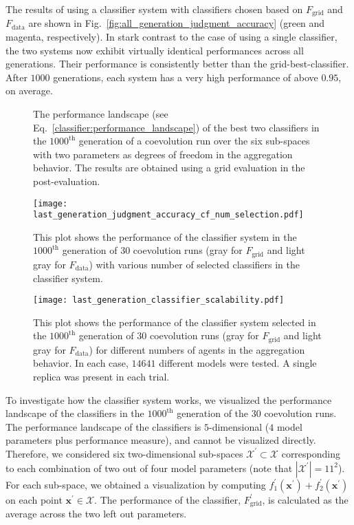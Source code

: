 The results of using a classifier system with classifiers chosen based on $F_\textrm{grid}$ and $F_\textrm{data}$ are shown in Fig.~\ref{fig:all_generation_judgment_accuracy} (green and magenta, respectively). In stark contrast to the case of using a single classifier, the two systems now exhibit virtually identical performances across all generations. Their performance is consistently better than the grid-best-classifier. After $1000$ generations, each system has a very high performance of above $0.95$, on average.
%
\begin{figure}[!t]
	\centering
		\caption{The performance landscape (see Eq.~\eqref{classifier:performance_landscape}) of the best two classifiers in the $1000^\textrm{th}$ generation of a coevolution run over the six sub-spaces with two parameters as degrees of freedom in the aggregation behavior. The results are obtained using a grid evaluation in the post-evaluation.}
		\label{fig:grid_visualization}
\end{figure}
%
\begin{figure}[!t]%
	\centering
	\texttt{[image: last\_generation\_judgment\_accuracy\_cf\_num\_selection.pdf]}
	\caption{This plot shows the performance of the classifier system in the $1000^\mathrm{th}$ generation of $30$ coevolution runs (gray for $F_\textrm{grid}$ and light gray for $F_\textrm{data}$) with various number of selected classifiers in the classifier system.}
	\label{fig:last_generation_judgment_accuracy_cf_num_selection}
\end{figure}
%
\begin{figure}[!t]
    \centering
    \texttt{[image: last\_generation\_classifier\_scalability.pdf]}
    \caption{This plot shows the performance of the classifier system selected in the $1000^\mathrm{th}$ generation of $30$ coevolution runs (gray for $F_\textrm{grid}$ and light gray for $F_\textrm{data}$) for different numbers of agents in the aggregation behavior. In each case, $14641$ different models were tested. A single replica was present in each trial.}
    \label{fig:classifier_scalability_aggregation}
\end{figure}
%
To investigate how the classifier system works, we visualized the performance landscape of the classifiers in the $1000^\textrm{th}$ generation of the $30$ coevolution runs. The performance landscape of the classifiers is $5$-dimensional ($4$ model parameters plus performance measure), and cannot be visualized directly. Therefore, we considered six two-dimensional sub-spaces $\mathcal{X}^{\prime}\subset \mathcal{X}$ corresponding to each combination of two out of four model parameters (note that $|\mathcal{X}^\prime|=11^2$). For each sub-space, we obtained a visualization by computing $f^\prime_1(\mathbf{x}^\prime) + f^\prime_2(\mathbf{x}^\prime)$ on each point $\mathbf{x}^\prime \in \mathcal{X}$. The performance of the classifier, $F^{\prime}_{\textrm{grid}}$, is calculated as the average across the two left out parameters. 
